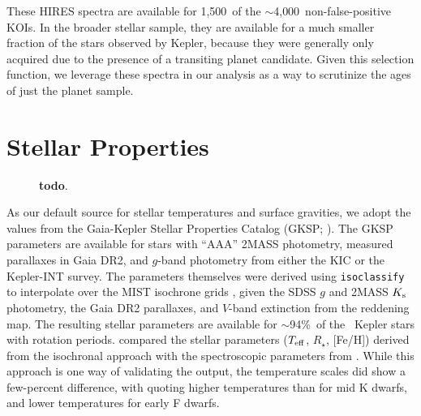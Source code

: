 \documentclass[11pt,twocolumn,tighten]{aastex63}
\newcommand{\fracstarswithprotwithbtwenty}{{$\sim$94\%}}
\newcommand{\nkoisnofp}{{$\sim$4{,}000}} %
\newcommand{\nkoiswithhires}{{1{,}500}}
\begin{document}
These HIRES spectra are available for \nkoiswithhires\ of the
\nkoisnofp\ non-false-positive KOIs.
In the broader stellar sample, they are available for a much smaller 
fraction of the stars observed by Kepler, because they were generally only
acquired due to the presence of a transiting planet candidate.
Given this selection function,
we leverage these spectra in our analysis as a way to scrutinize the
ages of just the planet sample.



\section{Stellar Properties}
\label{sec:stellarprops}

\begin{figure}[!t]
	\begin{center}
	
	\end{center}
	\vspace{-0.5cm}
	\caption{
    {\bf todo}.
	}
	\label{fig:stellarprops}
\end{figure}



As our default source for stellar temperatures and surface gravities,
we adopt the values from the Gaia-Kepler Stellar Properties Catalog
(GKSP; \citealt{Berger_2020a_catalog}).  The GKSP parameters are
available for stars with ``AAA'' 2MASS photometry, measured parallaxes
in Gaia DR2,  and $g$-band photometry from either the KIC or the
Kepler-INT survey.  The parameters themselves were derived using
\texttt{isoclassify} \citep{2017ApJ...844..102H} to interpolate over
the MIST isochrone grids
\citep{2016ApJ...823..102C,2016ApJS..222....8D}, given the SDSS $g$
and 2MASS $K_{\rm s}$ photometry, the Gaia DR2 parallaxes, and
$V$-band extinction from the \citet{2018MNRAS.478..651G} reddening
map.  The resulting stellar parameters are available for
\fracstarswithprotwithbtwenty\ of the \nuniqstarsantosrot\ Kepler
stars with rotation periods.
\citet{David_2021} compared the stellar parameters ($T_{\rm eff}$,
$R_\star$, [Fe/H]) derived from the \citet{Berger_2020a_catalog}
isochronal approach with the spectroscopic parameters from
\citet{Fulton_2018}.  While this approach is one way of validating the
\citet{Berger_2020a_catalog} output, the temperature scales did show a
few-percent difference, with  quoting higher
temperatures than  for mid K dwarfs,
and lower temperatures for early F dwarfs.
\end{document}
